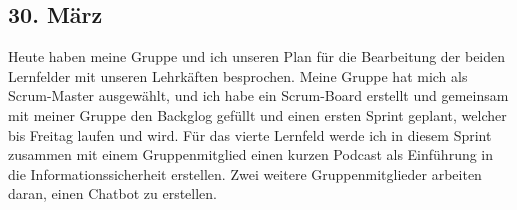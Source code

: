 \subsection{30. März}
Heute haben meine Gruppe und ich unseren Plan für die Bearbeitung der beiden Lernfelder mit unseren Lehrkäften besprochen. Meine Gruppe hat mich als Scrum-Master ausgewählt, und ich habe ein Scrum-Board erstellt und gemeinsam mit meiner Gruppe den Backglog gefüllt und einen ersten Sprint geplant, welcher bis Freitag laufen und wird. Für das vierte Lernfeld werde ich in diesem Sprint zusammen mit einem Gruppenmitglied einen kurzen Podcast als Einführung in die Informationssicherheit erstellen. Zwei weitere Gruppenmitglieder arbeiten daran, einen Chatbot zu erstellen.
